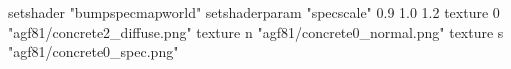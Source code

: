 setshader "bumpspecmapworld"
setshaderparam "specscale" 0.9 1.0 1.2
   texture 0 "agf81/concrete2_diffuse.png"
   texture n "agf81/concrete0_normal.png"
   texture s "agf81/concrete0_spec.png"